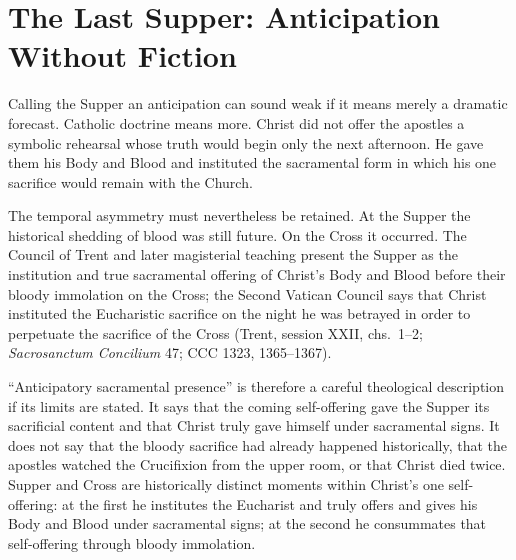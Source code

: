 \section{The Last Supper: Anticipation Without Fiction}

Calling the Supper an anticipation can sound weak if it means merely a dramatic
forecast. Catholic doctrine means more. Christ did not offer the apostles a
symbolic rehearsal whose truth would begin only the next afternoon. He gave
them his Body and Blood and instituted the sacramental form in which his one
sacrifice would remain with the Church.

The temporal asymmetry must nevertheless be retained. At the Supper the
historical shedding of blood was still future. On the Cross it occurred. The
Council of Trent and later magisterial teaching present the Supper as the
institution and true sacramental offering of Christ's Body and Blood before
their bloody immolation on the Cross; the Second Vatican Council says that
Christ instituted the Eucharistic sacrifice on the night he was betrayed in
order to perpetuate the sacrifice of the Cross (Trent, session XXII,
chs.~1--2; \emph{Sacrosanctum
Concilium} 47; CCC 1323, 1365--1367).

``Anticipatory sacramental presence'' is therefore a careful theological
description if its limits are stated. It says that the coming self-offering
gave the Supper its sacrificial content and that Christ truly gave himself
under sacramental signs. It does not say that the bloody sacrifice had already
happened historically, that the apostles watched the Crucifixion from the
upper room, or that Christ died twice. Supper and Cross are historically
distinct moments within Christ's one self-offering: at the first he institutes
the Eucharist and truly offers and gives his Body and Blood under sacramental
signs; at the second he consummates that self-offering through bloody
immolation.

